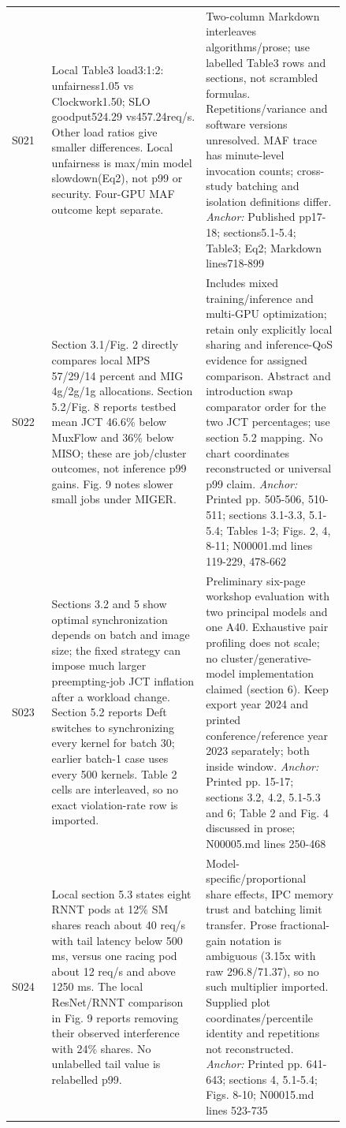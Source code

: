 \begin{longtable}{P{0.105\linewidth}P{0.39\linewidth}P{0.35\linewidth}}
S021 \cite{inferfair} & Local Table3 load3:1:2: unfairness1.05 vs Clockwork1.50; SLO goodput524.29 vs457.24req/s. Other load ratios give smaller differences. Local unfairness is max/min model slowdown(Eq2), not p99 or security. Four-GPU MAF outcome kept separate. & Two-column Markdown interleaves algorithms/prose; use labelled Table3 rows and sections, not scrambled formulas. Repetitions/variance and software versions unresolved. MAF trace has minute-level invocation counts; cross-study batching and isolation definitions differ. \emph{Anchor:} Published pp17-18; sections5.1-5.4; Table3; Eq2; Markdown lines718-899 \\
S022 \cite{miger} & Section 3.1/Fig. 2 directly compares local MPS 57/29/14 percent and MIG 4g/2g/1g allocations. Section 5.2/Fig. 8 reports testbed mean JCT 46.6\% below MuxFlow and 36\% below MISO; these are job/cluster outcomes, not inference p99 gains. Fig. 9 notes slower small jobs under MIGER. & Includes mixed training/inference and multi-GPU optimization; retain only explicitly local sharing and inference-QoS evidence for assigned comparison. Abstract and introduction swap comparator order for the two JCT percentages; use section 5.2 mapping. No chart coordinates reconstructed or universal p99 claim. \emph{Anchor:} Printed pp. 505-506, 510-511; sections 3.1-3.3, 5.1-5.4; Tables 1-3; Figs. 2, 4, 8-11; N00001.md lines 119-229, 478-662 \\
S023 \cite{deft} & Sections 3.2 and 5 show optimal synchronization depends on batch and image size; the fixed strategy can impose much larger preempting-job JCT inflation after a workload change. Section 5.2 reports Deft switches to synchronizing every kernel for batch 30; earlier batch-1 case uses every 500 kernels. Table 2 cells are interleaved, so no exact violation-rate row is imported. & Preliminary six-page workshop evaluation with two principal models and one A40. Exhaustive pair profiling does not scale; no cluster/generative-model implementation claimed (section 6). Keep export year 2024 and printed conference/reference year 2023 separately; both inside window. \emph{Anchor:} Printed pp. 15-17; sections 3.2, 4.2, 5.1-5.3 and 6; Table 2 and Fig. 4 discussed in prose; N00005.md lines 250-468 \\
S024 \cite{fastgshare} & Local section 5.3 states eight RNNT pods at 12\% SM shares reach about 40 req/s with tail latency below 500 ms, versus one racing pod about 12 req/s and above 1250 ms. The local ResNet/RNNT comparison in Fig. 9 reports removing their observed interference with 24\% shares. No unlabelled tail value is relabelled p99. & Model-specific/proportional share effects, IPC memory trust and batching limit transfer. Prose fractional-gain notation is ambiguous (3.15x with raw 296.8/71.37), so no such multiplier imported. Supplied plot coordinates/percentile identity and repetitions not reconstructed. \emph{Anchor:} Printed pp. 641-643; sections 4, 5.1-5.4; Figs. 8-10; N00015.md lines 523-735 \\

\end{longtable}
